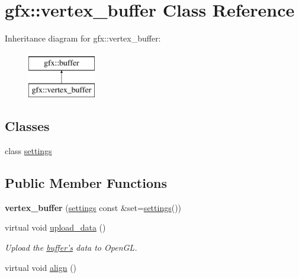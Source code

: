 \hypertarget{classgfx_1_1vertex__buffer}{\section{gfx\-:\-:vertex\-\_\-buffer Class Reference}
\label{classgfx_1_1vertex__buffer}
}
Inheritance diagram for gfx\-:\-:vertex\-\_\-buffer\-:\begin{figure}[H]
\begin{center}
\leavevmode
\includegraphics[height=2.000000cm]{classgfx_1_1vertex__buffer}
\end{center}
\end{figure}
\subsection*{Classes}
\begin{DoxyCompactItemize}
\item 
class \hyperlink{classgfx_1_1vertex__buffer_1_1settings}{settings}
\end{DoxyCompactItemize}
\subsection*{Public Member Functions}
\begin{DoxyCompactItemize}
\item 
\hypertarget{classgfx_1_1vertex__buffer_a40482a1a31630be86643bf33846ddcdd}{{\bfseries vertex\-\_\-buffer} (\hyperlink{classgfx_1_1vertex__buffer_1_1settings}{settings} const \&set=\hyperlink{classgfx_1_1vertex__buffer_1_1settings}{settings}())}\label{classgfx_1_1vertex__buffer_a40482a1a31630be86643bf33846ddcdd}

\item 
virtual void \hyperlink{classgfx_1_1vertex__buffer_a3248a790af715bc3b211d81ffd8a686b}{upload\-\_\-data} ()
\begin{DoxyCompactList}\small\item\em Upload the \hyperlink{classgfx_1_1buffer}{buffer's} data to Open\-G\-L. \end{DoxyCompactList}\item 
virtual void \hyperlink{classgfx_1_1vertex__buffer_abe471eb3dee70c2b0f01976e3161f157}{align} ()
\end{DoxyCompactItemize}
